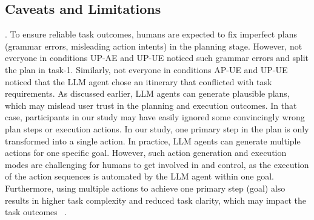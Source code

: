 \subsection{Caveats and Limitations}
\label{sec-limitation}
.
To ensure reliable task outcomes, humans are expected to fix imperfect plans (\eg grammar errors, misleading action intents) in the planning stage. 
However, not everyone in conditions UP-AE and UP-UE noticed such grammar errors and split the plan in task-1. 
Similarly, not everyone in conditions AP-UE and UP-UE noticed that the LLM agent chose an itinerary that conflicted with task requirements. 
As discussed earlier, LLM agents can generate plausible plans, which may mislead user trust in the planning and execution outcomes. 
In that case, participants in our study may have easily ignored some convincingly wrong plan steps or execution actions. 
In our study, one primary step in the plan is only transformed into a single action. In practice, LLM agents can generate multiple actions for one specific goal. 
However, such action generation and execution modes are challenging for humans to get involved in and control, as the execution of the action sequences is automated by the LLM agent within one goal. 
Furthermore, using multiple actions to achieve one primary step (\ie goal) also results in higher task complexity and reduced task clarity, which may impact the task outcomes %
~\cite{gadiraju2017clarity}. %

